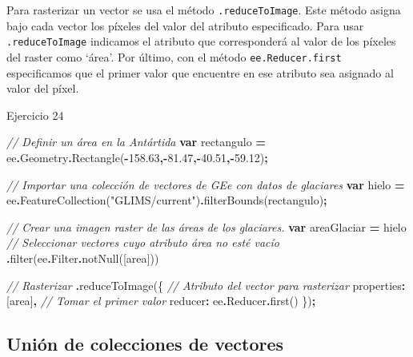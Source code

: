 \documentclass[
  12pt,
  letterpaper,
  twoside]{book}
\newenvironment{Shaded}{\begin{snugshade}}{\end{snugshade}}
\newcommand{\AttributeTok}[1]{\textcolor[rgb]{0.77,0.63,0.00}{#1}}
\newcommand{\CommentTok}[1]{\textcolor[rgb]{0.56,0.35,0.01}{\textit{#1}}}
\newcommand{\DataTypeTok}[1]{\textcolor[rgb]{0.13,0.29,0.53}{#1}}
\newcommand{\FloatTok}[1]{\textcolor[rgb]{0.00,0.00,0.81}{#1}}
\newcommand{\FunctionTok}[1]{\textcolor[rgb]{0.00,0.00,0.00}{#1}}
\newcommand{\KeywordTok}[1]{\textcolor[rgb]{0.13,0.29,0.53}{\textbf{#1}}}
\newcommand{\NormalTok}[1]{#1}
\newcommand{\OperatorTok}[1]{\textcolor[rgb]{0.81,0.36,0.00}{\textbf{#1}}}
\newcommand{\StringTok}[1]{\textcolor[rgb]{0.31,0.60,0.02}{#1}}
\begin{document}
Para rasterizar un vector se usa el método \texttt{.reduceToImage}. Este método asigna bajo cada vector los píxeles del valor del atributo especificado. Para usar \texttt{.reduceToImage} indicamos el atributo que corresponderá al valor de los píxeles del raster como `área'. Por último, con el método \texttt{ee.Reducer.first} especificamos que el primer valor que encuentre en ese atributo sea asignado al valor del píxel.

Ejercicio 24

\begin{Shaded}
\begin{Highlighting}[]
\CommentTok{// Definir un área en la Antártida}
\KeywordTok{var}\NormalTok{ rectangulo }\OperatorTok{=}\NormalTok{ ee}\OperatorTok{.}\AttributeTok{Geometry}\OperatorTok{.}\FunctionTok{Rectangle}\NormalTok{(}\OperatorTok{{-}}\FloatTok{158.63}\OperatorTok{,{-}}\FloatTok{81.47}\OperatorTok{,{-}}\FloatTok{40.51}\OperatorTok{,{-}}\FloatTok{59.12}\NormalTok{)}\OperatorTok{;}

\CommentTok{// Importar una colección de vectores de GEe con datos de glaciares}
\KeywordTok{var}\NormalTok{ hielo }\OperatorTok{=}\NormalTok{ ee}\OperatorTok{.}\FunctionTok{FeatureCollection}\NormalTok{(}\StringTok{"GLIMS/current"}\NormalTok{)}\OperatorTok{.}\FunctionTok{filterBounds}\NormalTok{(rectangulo)}\OperatorTok{;}

\CommentTok{// Crear una imagen raster de las áreas de los glaciares.}
\KeywordTok{var}\NormalTok{ areaGlaciar }\OperatorTok{=}\NormalTok{ hielo}
\CommentTok{// Seleccionar vectores cuyo atributo área no esté vacío}
    \OperatorTok{.}\FunctionTok{filter}\NormalTok{(ee}\OperatorTok{.}\AttributeTok{Filter}\OperatorTok{.}\FunctionTok{notNull}\NormalTok{([}\StringTok{\textquotesingle{}area\textquotesingle{}}\NormalTok{])) }
    
\CommentTok{// Rasterizar  }
\OperatorTok{.}\FunctionTok{reduceToImage}\NormalTok{(\{}
    \CommentTok{// Atributo del vector para rasterizar}
    \DataTypeTok{properties}\OperatorTok{:}\NormalTok{ [}\StringTok{\textquotesingle{}area\textquotesingle{}}\NormalTok{]}\OperatorTok{,} 
    \CommentTok{// Tomar el primer valor}
    \DataTypeTok{reducer}\OperatorTok{:}\NormalTok{ ee}\OperatorTok{.}\AttributeTok{Reducer}\OperatorTok{.}\FunctionTok{first}\NormalTok{()  }
\NormalTok{    \})}\OperatorTok{;}
\end{Highlighting}
\end{Shaded}

\hypertarget{uniuxf3n-de-colecciones-de-vectores}{%
\subsection{Unión de colecciones de vectores}\label{uniuxf3n-de-colecciones-de-vectores}}
\end{document}
